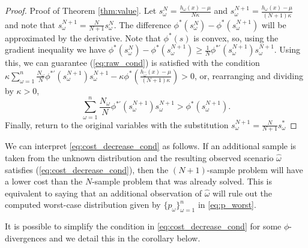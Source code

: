 \documentclass[12pt]{article}
\theoremstyle{plain}
\theoremstyle{definition}
\theoremstyle{remark}
\begin{document}
\begin{proof}{\sc Proof of Theorem \ref{thm:value}.}
	Let $s^N_\omega = \frac{h_\omega(x) - \mu}{N\kappa}$ and $s^{N+1}_\omega = \frac{h_\omega(x) - \mu}{(N+1)\kappa}$ and note that $s^{N+1}_\omega = \tfrac{N}{N+1} s^N_\omega$.
	The difference $\phi^*(s^N_\omega) - \phi^*(s^{N+1}_\omega)$ will be approximated by the derivative.
Note that $\phi^*(s)$ is convex, so, using the gradient inequality we have $\phi^*(s^N_\omega) - \phi^*(s^{N+1}_\omega) \geq \frac{1}{N} \phi^{*\prime}(s^{N+1}_\omega) s^{N+1}_\omega$. 
	Using this, we can guarantee (\ref{eq:raw_cond}) is satisfied with the condition $\kappa \sum_{\omega=1}^n \frac{N_\omega}{N} \phi^{*\prime}(s^{N+1}_\omega) s^{N+1}_\omega - \kappa \phi^*\left(\frac{h_{\hat{\omega}}(x) - \mu}{(N+1)\kappa}\right) > 0$, or, rearranging and dividing by $\kappa > 0$,
	\begin{equation} \label{eq:main_value_derivation}
		\sum_{\omega=1}^n \frac{N_\omega}{N} \phi^{*\prime}(s^{N+1}_\omega) s^{N+1}_\omega > \phi^*(s^{N+1}_\omega).
	\end{equation}
	Finally, return to the original variables with the substitution $s^{N+1}_\omega = \frac{N}{N+1} s^*_\omega$
	\Halmos
\end{proof}

We can interpret \eqref{eq:cost_decrease_cond} as follows. If an additional sample is taken from the unknown distribution and the resulting observed scenario $\hat{\omega}$ satisfies (\ref{eq:cost_decrease_cond}), then the $(N+1)$-sample problem will have a lower cost than the $N$-sample problem that was already solved.
This is equivalent to saying that an additional observation of $\hat{\omega}$ will rule out the computed worst-case distribution given by $\{p_\omega\}_{\omega=1}^{n}$ in \eqref{eq:p_worst}.

It is possible to simplify the condition in \eqref{eq:cost_decrease_cond} for some $\phi$-divergences and we detail this in the corollary below. 
\end{document}
